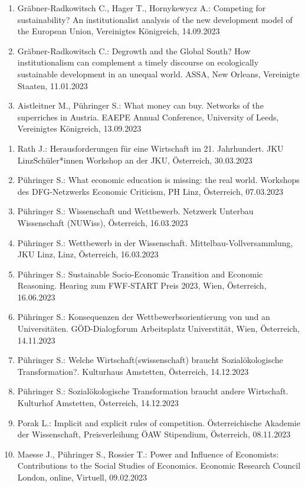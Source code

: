 \begin{enumerate}
	\item Gräbner-Radkowitsch C., Hager T., Hornykewycz A.: Competing for sustainability? An institutionalist analysis of the new development model of the European Union, Vereinigtes Königreich, 14.09.2023
	\item Gräbner-Radkowitsch C.: Degrowth and the Global South? How institutionalism can complement a timely discourse on ecologically sustainable development in an unequal world. ASSA, New Orleans, Vereinigte Staaten, 11.01.2023
	\item Aistleitner M., Pühringer S.: What money can buy. Networks of the superriches in Austria. EAEPE Annual Conference, University of Leeds, Vereinigtes Königreich, 13.09.2023
\end{enumerate}

\begin{enumerate}
	\item Rath J.: Herausforderungen für eine Wirtschaft im 21. Jahrhundert. JKU LinzSchüler*innen Workshop an der JKU, Österreich, 30.03.2023
	\item Pühringer S.: What economic education is missing: the real world. Workshops des DFG-Netzwerks Economic Criticism, PH Linz, Österreich, 07.03.2023
	\item Pühringer S.: Wissenschaft und Wettbewerb. Netzwerk Unterbau Wissenschaft (NUWiss), Österreich, 16.03.2023
	\item Pühringer S.: Wettbewerb in der Wissenschaft. Mittelbau-Vollversammlung, JKU Linz, Linz, Österreich, 16.03.2023
	\item Pühringer S.: Sustainable Socio-Economic Transition and Economic Reasoning. Hearing zum FWF-START Preis 2023, Wien, Österreich, 16.06.2023
	\item Pühringer S.: Konsequenzen der Wettbewerbsorientierung von und an Universitäten. GÖD-Dialogforum Arbeitsplatz Universtität, Wien, Österreich, 14.11.2023
	\item Pühringer S.: Welche Wirtschaft(swissenschaft) braucht Sozialökologische Transformation?. Kulturhaus Amstetten, Österreich, 14.12.2023
	\item Pühringer S.: Sozialökologische Transformation braucht andere Wirtschaft. Kulturhof Amstetten, Österreich, 14.12.2023
	\item Porak L.: Implicit and explicit rules of competition. Österreichische Akademie der Wissenschaft, Preisverleihung ÖAW Stipendium, Österreich, 08.11.2023
	\item Maesse J., Pühringer S., Rossier T.: Power and Influence of Economists: Contributions to the Social Studies of Economics. Economic Research Council London, online, Virtuell, 09.02.2023

\end{enumerate}
